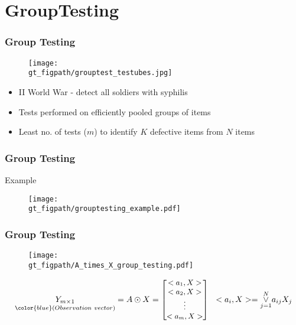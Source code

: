 \section{GroupTesting}
\begin{frame}\frametitle{Group Testing}
	\begin{figure}[t]
		\centering
		\texttt{[image: \\gt\_figpath/grouptest\_testubes.jpg]}
	\end{figure}

\begin{itemize}
	\item II World War - detect all soldiers with syphilis
	\item Tests performed on efficiently pooled groups of items
	\item Least no. of tests ($m$) to identify $K$ defective items from $N$ items
\end{itemize}	

\end{frame}

\begin{frame}\frametitle{Group Testing}
\alert{Example}
\vspace{-0.3in}
	\begin{figure}[t]
		\centering
		\texttt{[image: \\gt\_figpath/grouptesting\_example.pdf]}
	\end{figure}
\end{frame}


\begin{frame} \frametitle{Group Testing}
\begin{figure}[t]
\centering
\texttt{[image: \\gt\_figpath/A\_times\_X\_group\_testing.pdf]}
\end{figure}

\begin{block}
	{
		\[ \small \underset{\color{blue}(Observation \ vector)}{Y_{m \times 1}} = A \odot X = \begin{bmatrix}
		{<a_1,X>} \\
		{<a_2,X>}  \\
		\vdots  \\
		{<a_m,X>}
		\end{bmatrix} \ \   <a_i , X> = \overset{N}{\underset{j=1 }{\vee}} a_{ij}X_j  \] }
		
\end{block}
\end{frame}

